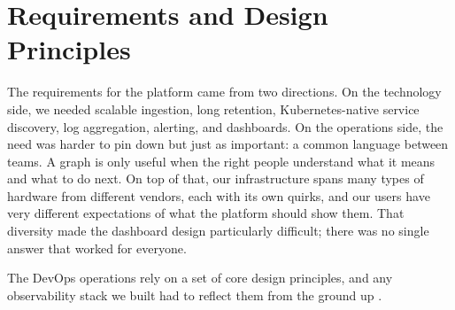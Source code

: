 \section{Requirements and Design Principles}

The requirements for the platform came from two directions. On the technology side, we needed
scalable ingestion, long retention, Kubernetes-native service discovery, log aggregation, alerting,
and dashboards. On the operations side, the need was harder to pin down but just as important: a
common language between teams. A graph is only useful when the right people understand what it
means and what to do next. On top of that, our infrastructure spans many types of hardware from
different vendors, each with its own quirks, and our users have very different expectations of what
the platform should show them. That diversity made the dashboard design particularly difficult;
there was no single answer that worked for everyone.

The DevOps operations rely on a set of core design principles, and any observability stack we built
had to reflect them from the ground up \cite{lsst-it-k8s-cookbook,prometheus-operator,grafana-loki-alloy,grafana-loki}.

